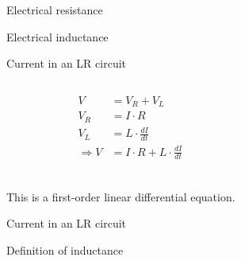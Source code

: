 \documentclass[compress]{beamer}
\begin{document}
{
    \begin{frame}{Electrical resistance}
    \end{frame}
}

{
    \begin{frame}{Electrical inductance}
    \end{frame}
}

\begin{frame}{Current in an LR circuit}
    \begin{columns}
        \begin{column}{0.5\linewidth}
            \begin{align*}
                V &= V_R + V_L \\
                V_R &= I \cdot R \\
                V_L &= L \cdot \frac{dI}{dt} \\
                \Rightarrow V &= I \cdot R + L \cdot \frac{dI}{dt} \\
            \end{align*}
        \end{column}
        \begin{column}{0.5\linewidth}
        \begin{center}
        \end{center}
        \end{column}
    \end{columns}

    \begin{center}
        This is a first-order linear differential equation.
    \end{center}
\end{frame}

{
    \begin{frame}{Current in an LR circuit}
    \end{frame}
}

{
    \begin{frame}{Definition of inductance}
    \end{frame}
}
\end{document}
